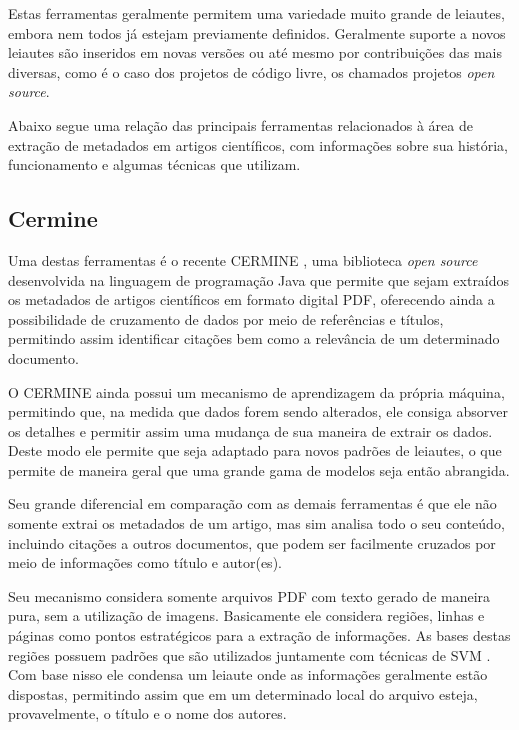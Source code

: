 Estas ferramentas geralmente permitem uma variedade muito grande de leiautes, embora nem todos já estejam previamente definidos. Geralmente suporte a novos leiautes são inseridos em novas versões ou até mesmo por contribuições das mais diversas, como é o caso dos projetos de código livre, os chamados projetos \textit{open source}.

Abaixo segue uma relação das principais ferramentas relacionados à área de extração de metadados em artigos científicos, com informações sobre sua história, funcionamento e algumas técnicas que utilizam.

\subsection{Cermine}
\label{ssec:cermine}


Uma destas ferramentas é o recente CERMINE \cite{cermine}, uma biblioteca \textit{open source} desenvolvida na linguagem de programação Java que permite que sejam extraídos os metadados de artigos científicos em formato digital PDF, oferecendo ainda a possibilidade de cruzamento de dados por meio de referências e títulos, permitindo assim identificar citações bem como a relevância de um determinado documento.

O CERMINE ainda possui um mecanismo de aprendizagem da própria máquina, permitindo que, na medida que dados forem sendo alterados, ele consiga absorver os detalhes e permitir assim uma mudança de sua maneira de extrair os dados. Deste modo ele permite que seja adaptado para novos padrões de leiautes, o que permite de maneira geral que uma grande gama de modelos seja então abrangida. 

Seu grande diferencial em comparação com as demais ferramentas é que ele não somente extrai os metadados de um artigo, mas sim analisa todo o seu conteúdo, incluindo citações a outros documentos, que podem ser facilmente cruzados por meio de informações como título e autor(es).

Seu mecanismo considera somente arquivos PDF com texto gerado de maneira pura, sem a utilização de imagens. Basicamente ele considera regiões, linhas e páginas como pontos estratégicos para a extração de informações. As bases destas regiões possuem padrões que são utilizados juntamente com técnicas de SVM \cite{Han-SVM}. Com base nisso ele condensa um leiaute onde as informações geralmente estão dispostas, permitindo assim que em um determinado local do arquivo esteja, provavelmente, o título e o nome dos autores. 

